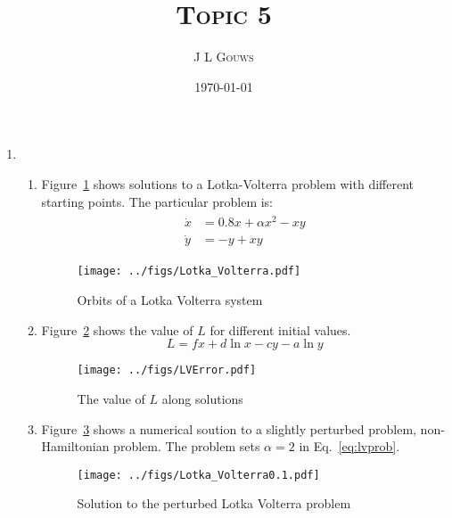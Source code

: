 \documentclass[12pt,a4]{article}
\title{
\textsc{Topic 5}
}
\author{\textsc{J L Gouws}
}
\date{\today
\\[1cm]}
\begin{document}
\thispagestyle{empty}

\maketitle

\begin{enumerate}
  \item
    \begin{enumerate}
      \item
        Figure~\ref{fig:Lotka_Volterra} shows solutions to a Lotka-Volterra problem with different starting points.
        The particular problem is:
        \begin{align}
          \begin{split}
            \dot x &= 0.8 x + \alpha x^2 - xy\\
            \dot y &= - y + xy
          \end{split}
          \label{eq:lvprob}
        \end{align}
        \begin{figure}[H]
          \centering
          \texttt{[image: ../figs/Lotka\_Volterra.pdf]} 
          \caption{Orbits of a Lotka Volterra system}
          \label{fig:Lotka_Volterra}
        \end{figure}

      \item
        Figure~\ref{fig:LVError} shows the value of $L$ for different initial values.
        \begin{equation*}
          L = f x + d \ln x - cy - a \ln y
        \end{equation*}

        \begin{figure}[H]
          \centering
          \texttt{[image: ../figs/LVError.pdf]}
          \caption{The value of $L$ along solutions}
          \label{fig:LVError}
        \end{figure}

      \item
        Figure~\ref{fig:Lotka_Volterra0.1} shows a numerical soution to a slightly perturbed problem, non-Hamiltonian problem.
        The problem sets $\alpha = 2 $ in Eq.~\ref{eq:lvprob}.
        \begin{figure}[H]
          \centering
          \texttt{[image: ../figs/Lotka\_Volterra0.1.pdf]}
          \caption{Solution to the perturbed Lotka Volterra problem}
          \label{fig:Lotka_Volterra0.1}
        \end{figure}


\end{enumerate}
\end{enumerate}
\end{document}
